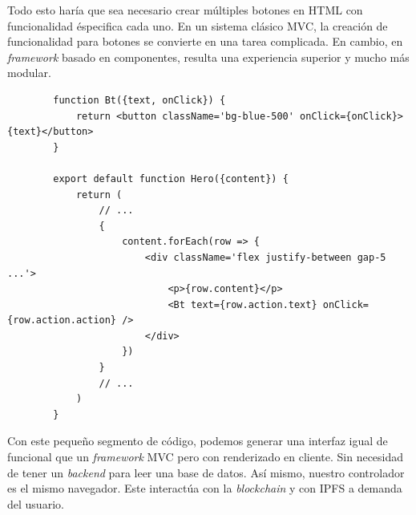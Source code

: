     Todo esto haría que sea necesario crear múltiples botones en HTML con funcionalidad éspecifica cada uno. En un sistema clásico MVC, la creación de funcionalidad para botones se convierte en una tarea complicada.
    En cambio, en \textit{framework} basado en componentes, resulta una experiencia superior y mucho más modular.
    \begin{lstlisting}
        function Bt({text, onClick}) {
            return <button className='bg-blue-500' onClick={onClick}>{text}</button>
        }

        export default function Hero({content}) {
            return (
                // ...
                {
                    content.forEach(row => {
                        <div className='flex justify-between gap-5 ...'>
                            <p>{row.content}</p>
                            <Bt text={row.action.text} onClick={row.action.action} />
                        </div>
                    })
                }
                // ...
            )
        }
    \end{lstlisting}
    Con este pequeño segmento de código, podemos generar una interfaz igual de funcional que un \textit{framework} MVC pero con renderizado en cliente. Sin necesidad de tener un \textit{backend} para leer una base de datos. Así mismo, nuestro controlador es el mismo navegador. Este interactúa con la \textit{blockchain} y con IPFS a demanda del usuario.
